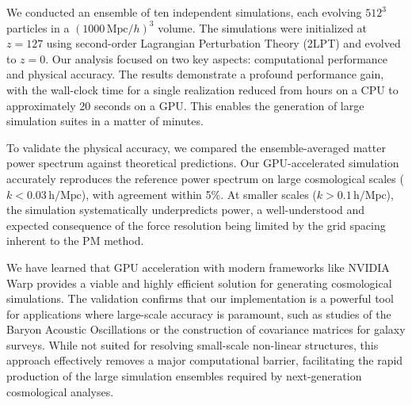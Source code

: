\documentclass[]{article}
\begin{document}
We conducted an ensemble of ten independent simulations, each evolving $512^3$ particles in a $(1000 \, \text{Mpc}/h)^3$ volume. The simulations were initialized at $z=127$ using second-order Lagrangian Perturbation Theory (2LPT) and evolved to $z=0$. Our analysis focused on two key aspects: computational performance and physical accuracy. The results demonstrate a profound performance gain, with the wall-clock time for a single realization reduced from hours on a CPU to approximately 20 seconds on a GPU. This enables the generation of large simulation suites in a matter of minutes.

To validate the physical accuracy, we compared the ensemble-averaged matter power spectrum against theoretical predictions. Our GPU-accelerated simulation accurately reproduces the reference power spectrum on large cosmological scales ($k < 0.03 \, \text{h/Mpc}$), with agreement within 5\%. At smaller scales ($k > 0.1 \, \text{h/Mpc}$), the simulation systematically underpredicts power, a well-understood and expected consequence of the force resolution being limited by the grid spacing inherent to the PM method.

We have learned that GPU acceleration with modern frameworks like NVIDIA Warp provides a viable and highly efficient solution for generating cosmological simulations. The validation confirms that our implementation is a powerful tool for applications where large-scale accuracy is paramount, such as studies of the Baryon Acoustic Oscillations or the construction of covariance matrices for galaxy surveys. While not suited for resolving small-scale non-linear structures, this approach effectively removes a major computational barrier, facilitating the rapid production of the large simulation ensembles required by next-generation cosmological analyses.


{}

\end{document}
